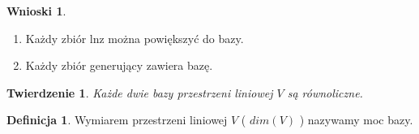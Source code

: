 \documentclass[12pt,a4paper]{article}
\theoremstyle{plain}
\newtheorem{tw}{Twierdzenie}[section]
\theoremstyle{definition}
\theoremstyle{definition}
\newtheorem{df}{Definicja}[section]
\theoremstyle{definition}
\theoremstyle{definition}
\theoremstyle{definition}
\theoremstyle{definition}
\theoremstyle{definition}
\theoremstyle{definition}
\newtheorem*{wn}{Wnioski}
\begin{document}
\begin{wn} \hfill
    \begin{enumerate}[{(}1{)}]
        \item Każdy zbiór lnz można powiększyć do bazy.
        \item Każdy zbiór generujący zawiera bazę.
    \end{enumerate}
\end{wn}

\begin{tw}
    Każde dwie bazy przestrzeni liniowej $ V $ są równoliczne.
\end{tw}

\begin{df}
    Wymiarem przestrzeni liniowej $ V $ ( $ dim(V) $ ) nazywamy moc bazy.
\end{df}


{\color{white} $\widehat{}$} %
\end{document}
